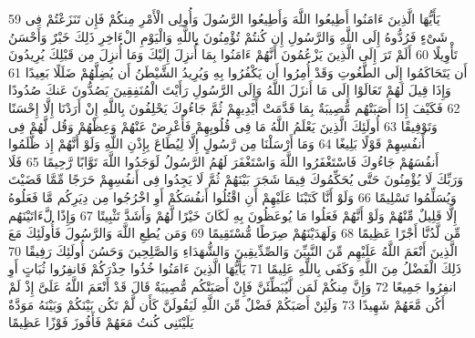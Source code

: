 \documentclass[20pt,a4paper]{article}
\begin{document}
{\tiny\colorbox{cl_aya}{59}} يَأَيُّهَا الَّذِينَ ءَامَنُوا أَطِيعُوا اللَّهَ وَأَطِيعُوا الرَّسُولَ وَأُولِى الْأَمْرِ مِنكُمْ فَإِن تَنَزَعْتُمْ فِى شَىْءٍ فَرُدُّوهُ إِلَى اللَّهِ وَالرَّسُولِ إِن كُنتُمْ تُؤْمِنُونَ بِاللَّهِ وَالْيَوْمِ الْءَاخِرِ ذَلِكَ خَيْرٌ وَأَحْسَنُ تَأْوِيلًا
{\tiny\colorbox{cl_aya}{60}} أَلَمْ تَرَ إِلَى الَّذِينَ يَزْعُمُونَ أَنَّهُمْ ءَامَنُوا بِمَا أُنزِلَ إِلَيْكَ وَمَا أُنزِلَ مِن قَبْلِكَ يُرِيدُونَ أَن يَتَحَاكَمُوا إِلَى الطَّغُوتِ وَقَدْ أُمِرُوا أَن يَكْفُرُوا بِهِ وَيُرِيدُ الشَّيْطَنُ أَن يُضِلَّهُمْ ضَلَلًا بَعِيدًا
{\tiny\colorbox{cl_aya}{61}} وَإِذَا قِيلَ لَهُمْ تَعَالَوْا إِلَى مَا أَنزَلَ اللَّهُ وَإِلَى الرَّسُولِ رَأَيْتَ الْمُنَفِقِينَ يَصُدُّونَ عَنكَ صُدُودًا
{\tiny\colorbox{cl_aya}{62}} فَكَيْفَ إِذَا أَصَبَتْهُم مُّصِيبَةٌ بِمَا قَدَّمَتْ أَيْدِيهِمْ ثُمَّ جَاءُوكَ يَحْلِفُونَ بِاللَّهِ إِنْ أَرَدْنَا إِلَّا إِحْسَنًا وَتَوْفِيقًا
{\tiny\colorbox{cl_aya}{63}} أُولَئِكَ الَّذِينَ يَعْلَمُ اللَّهُ مَا فِى قُلُوبِهِمْ فَأَعْرِضْ عَنْهُمْ وَعِظْهُمْ وَقُل لَّهُمْ فِى أَنفُسِهِمْ قَوْلًا بَلِيغًا
{\tiny\colorbox{cl_aya}{64}} وَمَا أَرْسَلْنَا مِن رَّسُولٍ إِلَّا لِيُطَاعَ بِإِذْنِ اللَّهِ وَلَوْ أَنَّهُمْ إِذ ظَّلَمُوا أَنفُسَهُمْ جَاءُوكَ فَاسْتَغْفَرُوا اللَّهَ وَاسْتَغْفَرَ لَهُمُ الرَّسُولُ لَوَجَدُوا اللَّهَ تَوَّابًا رَّحِيمًا
{\tiny\colorbox{cl_aya}{65}} فَلَا وَرَبِّكَ لَا يُؤْمِنُونَ حَتَّى يُحَكِّمُوكَ فِيمَا شَجَرَ بَيْنَهُمْ ثُمَّ لَا يَجِدُوا فِى أَنفُسِهِمْ حَرَجًا مِّمَّا قَضَيْتَ وَيُسَلِّمُوا تَسْلِيمًا
{\tiny\colorbox{cl_aya}{66}} وَلَوْ أَنَّا كَتَبْنَا عَلَيْهِمْ أَنِ اقْتُلُوا أَنفُسَكُمْ أَوِ اخْرُجُوا مِن دِيَرِكُم مَّا فَعَلُوهُ إِلَّا قَلِيلٌ مِّنْهُمْ وَلَوْ أَنَّهُمْ فَعَلُوا مَا يُوعَظُونَ بِهِ لَكَانَ خَيْرًا لَّهُمْ وَأَشَدَّ تَثْبِيتًا
{\tiny\colorbox{cl_aya}{67}} وَإِذًا لَّءَاتَيْنَهُم مِّن لَّدُنَّا أَجْرًا عَظِيمًا
{\tiny\colorbox{cl_aya}{68}} وَلَهَدَيْنَهُمْ صِرَطًا مُّسْتَقِيمًا
{\tiny\colorbox{cl_aya}{69}} وَمَن يُطِعِ اللَّهَ وَالرَّسُولَ فَأُولَئِكَ مَعَ الَّذِينَ أَنْعَمَ اللَّهُ عَلَيْهِم مِّنَ النَّبِيِّنَ وَالصِّدِّيقِينَ وَالشُّهَدَاءِ وَالصَّلِحِينَ وَحَسُنَ أُولَئِكَ رَفِيقًا
{\tiny\colorbox{cl_aya}{70}} ذَلِكَ الْفَضْلُ مِنَ اللَّهِ وَكَفَى بِاللَّهِ عَلِيمًا
{\tiny\colorbox{cl_aya}{71}} يَأَيُّهَا الَّذِينَ ءَامَنُوا خُذُوا حِذْرَكُمْ فَانفِرُوا ثُبَاتٍ أَوِ انفِرُوا جَمِيعًا
{\tiny\colorbox{cl_aya}{72}} وَإِنَّ مِنكُمْ لَمَن لَّيُبَطِّئَنَّ فَإِنْ أَصَبَتْكُم مُّصِيبَةٌ قَالَ قَدْ أَنْعَمَ اللَّهُ عَلَىَّ إِذْ لَمْ أَكُن مَّعَهُمْ شَهِيدًا
{\tiny\colorbox{cl_aya}{73}} وَلَئِنْ أَصَبَكُمْ فَضْلٌ مِّنَ اللَّهِ لَيَقُولَنَّ كَأَن لَّمْ تَكُن بَيْنَكُمْ وَبَيْنَهُ مَوَدَّةٌ يَلَيْتَنِى كُنتُ مَعَهُمْ فَأَفُوزَ فَوْزًا عَظِيمًا
\end{document}
